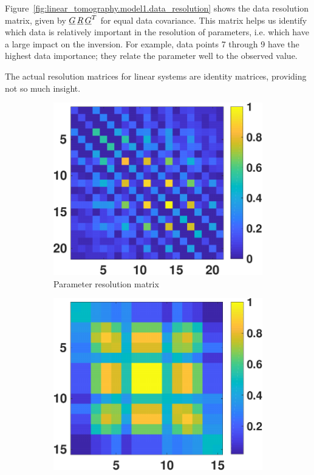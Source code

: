 Figure~\ref{fig:linear_tomography.model1.data_resolution} shows the data resolution matrix, given by $\underline{G}\,\underline{R}\,\underline{G}^T$ for equal data covariance. This matrix helps us identify which data is relatively important in the resolution of parameters, i.e. which have a large impact on the inversion. For example, data points 7 through 9 have the highest data importance; they relate the  parameter well to the observed value.

The actual resolution matrices for linear systems are identity matrices, providing not so much insight.

\begin{figure}
	\centering
	\begin{subfigure}{.48\textwidth}
		\centering
		\includegraphics[width=\textwidth]{figures/tomography/tomography_1/model_resolution}
		\caption{Parameter resolution matrix}
		\label{fig:linear_tomography.model1.parameter_resolution}
	\end{subfigure}\;
	\begin{subfigure}{.49\textwidth}
		\centering
		\includegraphics[width=\textwidth]{figures/tomography/tomography_1/data_resolution}

\end{subfigure}
\end{figure}
